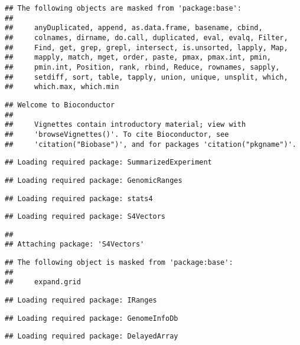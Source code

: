 \documentclass[]{article}
\begin{document}
\begin{verbatim}
## The following objects are masked from 'package:base':
## 
##     anyDuplicated, append, as.data.frame, basename, cbind,
##     colnames, dirname, do.call, duplicated, eval, evalq, Filter,
##     Find, get, grep, grepl, intersect, is.unsorted, lapply, Map,
##     mapply, match, mget, order, paste, pmax, pmax.int, pmin,
##     pmin.int, Position, rank, rbind, Reduce, rownames, sapply,
##     setdiff, sort, table, tapply, union, unique, unsplit, which,
##     which.max, which.min
\end{verbatim}

\begin{verbatim}
## Welcome to Bioconductor
## 
##     Vignettes contain introductory material; view with
##     'browseVignettes()'. To cite Bioconductor, see
##     'citation("Biobase")', and for packages 'citation("pkgname")'.
\end{verbatim}

\begin{verbatim}
## Loading required package: SummarizedExperiment
\end{verbatim}

\begin{verbatim}
## Loading required package: GenomicRanges
\end{verbatim}

\begin{verbatim}
## Loading required package: stats4
\end{verbatim}

\begin{verbatim}
## Loading required package: S4Vectors
\end{verbatim}

\begin{verbatim}
## 
## Attaching package: 'S4Vectors'
\end{verbatim}

\begin{verbatim}
## The following object is masked from 'package:base':
## 
##     expand.grid
\end{verbatim}

\begin{verbatim}
## Loading required package: IRanges
\end{verbatim}

\begin{verbatim}
## Loading required package: GenomeInfoDb
\end{verbatim}

\begin{verbatim}
## Loading required package: DelayedArray
\end{verbatim}
\end{document}
